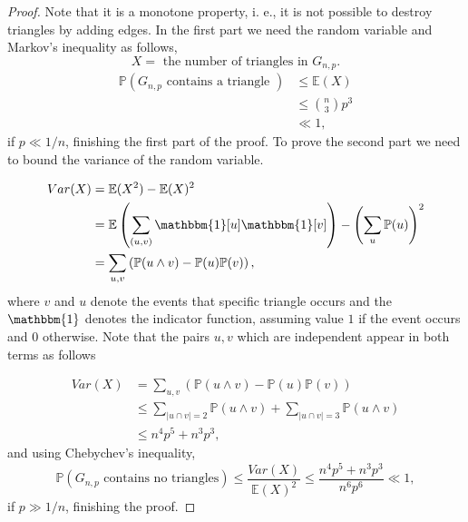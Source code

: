 \documentclass[12pt,twoside,a4paper]{book}
\numberwithin{equation}{section}
\theoremstyle{remark}
\begin{document}
\begin{proof}
Note that it is a monotone property, i. e., it is not possible to destroy triangles by adding edges. In the first part we need the random variable and  Markov's inequality as follows,
$$ X = \text{ the number of triangles in } G_{n,p}.$$
\begin{align*}
\mathbb{P}(G_{n,p}\text{ contains a triangle }) &\leq \mathbb{E}(X)\\
& \leq \binom{n}{3}p^3 \\
& \ll 1,
\end{align*}
if $ p \ll 1/n$, finishing the first part of the proof. To prove the second part we need to bound the variance of the random variable.

\begin{align*}
Var(X) &= \mathbb{E}(X^2) - \mathbb{E}(X)^2\\
& = \mathbb{E} \left( \sum_{(u, v)} \mathbbm{1}[u]\mathbbm{1}[v] \right) - \left( \sum_u \mathbb{P}(u) \right) ^2\\
& = \sum_{u,v} \left(\mathbb{P}(u \wedge v) - \mathbb{P}(u)\mathbb{P}(v)\right),
\end{align*}
where $v$ and $u$ denote the events that specific triangle occurs and the $\mathbbm{1}$ denotes the indicator function, assuming value $1$ if the event occurs and $0$ otherwise. Note that the pairs $u,v$ which are independent appear in both terms as follows

\begin{align*}
Var(X) &= \sum_{u,v} \left(\mathbb{P}(u \wedge v) - \mathbb{P}(u)\mathbb{P}(v)\right)\\
& \leq \sum_{|u \cap v| = 2}\mathbb{P}(u \wedge v) + \sum_{|u \cap v| = 3}\mathbb{P}(u \wedge v)\\
&\leq n^4 p^5 + n^3 p^3,
\end{align*}
and using Chebychev's inequality,
$$\mathbb{P}(G_{n,p} \text{ contains no triangles}) \leq \frac{Var(X)}{\mathbb{E}(X)^2} \leq \frac{n^4p^5 + n^3p^3 }{n^6p^6} \ll 1,$$
if $p \gg 1/n$, finishing the proof.
 \end{proof}
\end{document}

